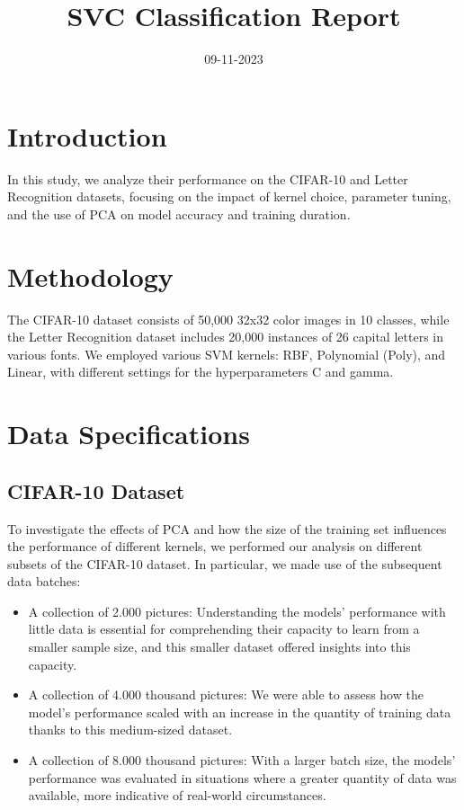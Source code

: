 \documentclass[conference]{IEEEtran}
\title{\Huge SVC Classification Report}
\author{\IEEEauthorblockN{Papagrigoriou Vasileios Savvas}
\IEEEauthorblockA{Auth}}
\date{09-11-2023}
\begin{document}
\maketitle

\section{Introduction}
In this study, we analyze their performance on the CIFAR-10 and Letter Recognition datasets, focusing on the impact of kernel choice, parameter tuning, and the use of PCA on model accuracy and training duration.

\section{Methodology}
The CIFAR-10 dataset consists of 50,000 32x32 color images in 10 classes, while the Letter Recognition dataset includes 20,000 instances of 26 capital letters in various fonts. We employed various SVM kernels: RBF, Polynomial (Poly), and Linear, with different settings for the hyperparameters C and gamma.

\section{Data Specifications}

\subsection{CIFAR-10 Dataset}

To investigate the effects of PCA and how the size of the training set influences the performance of different kernels, we performed our analysis on different subsets of the CIFAR-10 dataset. In particular, we made use of the subsequent data batches:

\begin{itemize}
\item A collection of 2.000 pictures: Understanding the models' performance with little data is essential for comprehending their capacity to learn from a smaller sample size, and this smaller dataset offered insights into this capacity.
\item A collection of 4.000 thousand pictures: We were able to assess how the model's performance scaled with an increase in the quantity of training data thanks to this medium-sized dataset.
\item A collection of 8.000 thousand pictures: With a larger batch size, the models' performance was evaluated in situations where a greater quantity of data was available, more indicative of real-world circumstances.
\end{itemize}
\end{document}
